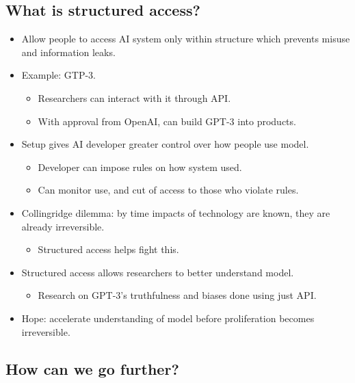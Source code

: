 \subsection{What is structured access?}

\begin{itemize}
    \item Allow people to access AI system only within structure which prevents misuse and information leaks.
    \item Example: GTP-3.
    \begin{itemize}
        \item Researchers can interact with it through API.
        \item With approval from OpenAI, can build GPT-3 into products.
    \end{itemize}
    \item Setup gives AI developer greater control over how people use model.
    \begin{itemize}
        \item Developer can impose rules on how system used.
        \item Can monitor use, and cut of access to those who violate rules.
    \end{itemize}
    \item Collingridge dilemma: by time impacts of technology are known, they are already irreversible.
    \begin{itemize}
        \item Structured access helps fight this.
    \end{itemize}
    \item Structured access allows researchers to better understand model.
    \begin{itemize}
        \item Research on GPT-3's truthfulness and biases done using just API.
    \end{itemize}
    \item Hope: accelerate understanding of model before proliferation becomes irreversible.
\end{itemize}


\subsection{How can we go further?}

